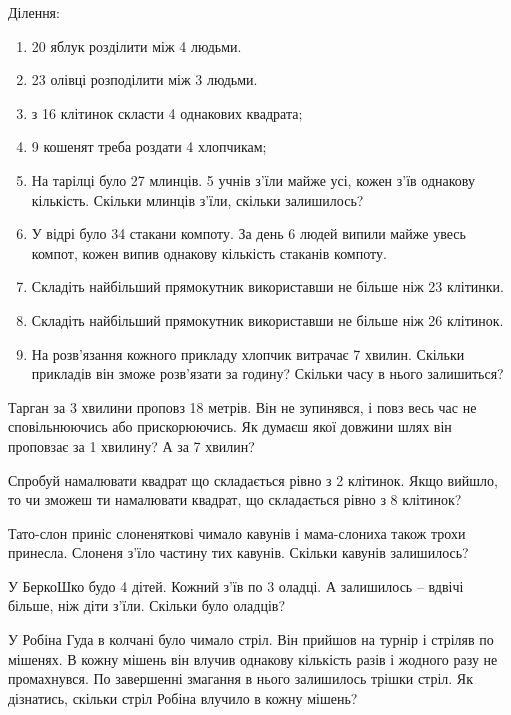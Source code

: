 \problem
Ділення:
\begin{enumerate}
    \item 20 яблук розділити між 4 людьми.
    \item 23 олівці розподілити між 3 людьми.
    \item з 16 клітинок скласти 4 однакових квадрата;
    \item 9 кошенят треба роздати 4 хлопчикам;
    \item На тарілці було 27 млинців. 5 учнів з'їли майже усі,
    кожен з'їв однакову кількість.
    Скільки млинців з'їли, скільки залишилось?
    \item У відрі було 34 стакани компоту.
    За день 6 людей випили майже увесь компот,
    кожен випив однакову кількість стаканів компоту.
    \item Складіть найбільший прямокутник використавши
    не більше ніж 23 клітинки.
    \item Складіть найбільший прямокутник використавши
    не більше ніж 26 клітинок.
    \item На розв'язання кожного прикладу хлопчик витрачає 7 хвилин.
    Скільки прикладів він зможе розв'язати за годину?
    Скільки часу в нього залишиться?
\end{enumerate}


\problem
Тарган за 3 хвилини проповз 18 метрів.
Він не зупинявся, і повз весь час не сповільнюючись або прискорюючись.
Як думаєш якої довжини шлях він проповзає за 1 хвилину?
А за 7 хвилин?


\problem
Спробуй намалювати квадрат що складається рівно з 2 клітинок.
Якщо вийшло, то чи зможеш ти намалювати квадрат,
що складається рівно з 8 клітинок?


\problem
Тато-слон приніс слоненяткові чимало кавунів
і мама-слониха також трохи принесла.
Слоненя з’їло частину тих кавунів.
Скільки кавунів залишилось?


\problem
У БеркоШко будо 4 дітей. Кожний з’їв по 3 оладці.
А залишилось – вдвічі більше, ніж діти з’їли.
Скільки було оладців?


\problem
У Робіна Гуда в колчані було чимало стріл.
Він прийшов на турнір і стріляв по мішенях.
В кожну мішень він влучив однакову кількість разів
і жодного разу не промахнувся.
По завершенні змагання в нього залишилось трішки стріл.
Як дізнатись, скільки стріл Робіна влучило в кожну мішень?


